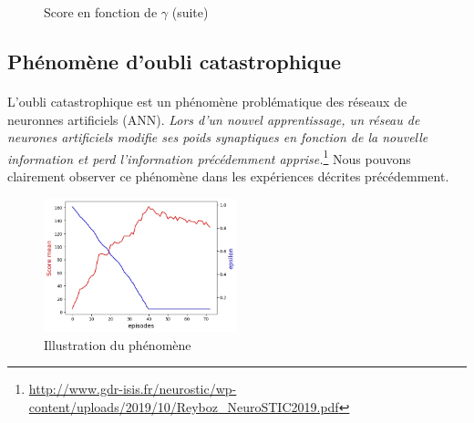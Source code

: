 \documentclass[12pt,oneside,a4paper]{article}
\begin{document}
\begin{figure}[hbt!]
{        }
        \hspace{0mm}
        \caption{Score en fonction de $\gamma$ (suite)}
    \end{figure}

    \newpage

    \subsection{Phénomène d'oubli catastrophique}

    \paragraph{}
    L'oubli catastrophique est un phénomène problématique des réseaux de neuronnes artificiels (ANN).
    \textit{Lors d’un nouvel apprentissage, un réseau
    de neurones artificiels modifie ses poids synaptiques en fonction
    de la nouvelle information et perd l’information précédemment
    apprise.}\footnote{\url{http://www.gdr-isis.fr/neurostic/wp-content/uploads/2019/10/Reyboz_NeuroSTIC2019.pdf}}
    Nous pouvons clairement observer ce phénomène dans les expériences décrites précédemment.
    \begin{figure}[h]
        \centering
        \includegraphics[width=0.5\textwidth] {./catastrophic_forgetting.jpg}
        \caption{Illustration du phénomène}
    \end{figure}
\end{document}
